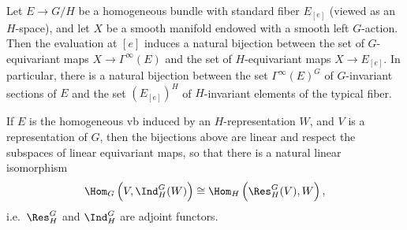 \begin{thm}\label{thm 1.4.4 Cap}
    Let $E\to G\slash H$ be a homogeneous bundle with standard fiber $E_{[e]}$ (viewed as an $H$-space), and let $X$ be a smooth manifold endowed with a smooth left $G$-action. Then the evaluation at $[e]$ induces a natural bijection between the set of $G$-equivariant maps $X\to \Gamma^\infty(E)$ and the set of $H$-equivariant maps $X\to E_{[e]}$. In particular, there is a natural bijection between the set $\Gamma^\infty(E)^G$ of $G$-invariant sections of $E$ and the set $(E_{[e]})^H$ of $H$-invariant elements of the typical fiber.

    If $E$ is the homogeneous \gls{vb} induced by an $H$-representation $W$, and $V$ is a representation of $G$, then the bijections above are linear and respect the subspaces of linear equivariant maps, so that there is a natural linear isomorphism
    \[\Hom_G\left(V,\Ind^G_H(W)\right)\cong \Hom_H\left(\Res^G_H(V),W\right),\]
    i.e.\ $\Res^G_H$ and $\Ind^G_H$ are adjoint functors.
\end{thm}
